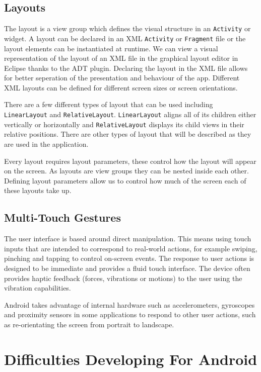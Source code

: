 \documentclass[draft]{report}
\begin{document}
\subsection{Layouts}
\label{sub:layouts}

The layout is a view group which defines the visual structure in an {\tt Activity} or widget. A layout can be declared in an XML {\tt Activity} or {\tt Fragment} file or the layout elements can be instantiated at runtime. We can view a visual representation of the layout of an XML file in the graphical layout editor in Eclipse thanks to the ADT plugin. Declaring the layout in the XML file allows for better seperation of the presentation and behaviour of the app. Different XML layouts can be defined for different screen sizes or screen orientations. 

There are a few different types of layout that can be used including {\tt LinearLayout} and {\tt RelativeLayout}. {\tt LinearLayout} aligns all of its children either vertically or horizontally and {\tt RelativeLayout} displays its child views in their relative positions. There are other types of layout that will be described as they are used in the application.

Every layout requires layout parameters, these control how the layout will appear on the screen. As layouts are view groups they can be nested inside each other. Defining layout parameters allow us to control how much of the screen each of these layouts take up.

\subsection{Multi-Touch Gestures}
\label{sub:gestures}

The user interface is based around direct manipulation. This means using touch inputs that are intended to correspond to real-world actions, for example swiping, pinching and tapping to control on-screen events. The response to user actions is designed to be immediate and provides a fluid touch interface. The device often provides haptic feedback (forces, vibrations or motions) to the user using the vibration capabilities.

Android takes advantage of internal hardware such as accelerometers, gyroscopes and proximity sensors in some applications to respond to other user actions, such as re-orientating the screen from portrait to landscape.

\section{Difficulties Developing For Android}
\end{document}
